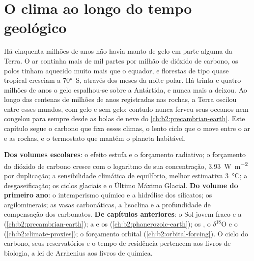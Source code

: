 \chapter{O clima ao longo do tempo geológico}\label{ch:b2:deep-time-climate}

Há cinquenta milhões de anos não havia manto de gelo em parte alguma da Terra. O ar continha mais de
mil partes por milhão de dióxido de carbono, os polos tinham aquecido muito mais que o equador, e
florestas de tipo quase tropical cresciam a \ang{70}~S, através dos meses da noite polar. Há trinta e quatro
milhões de anos o gelo espalhou-se sobre a Antártida, e nunca mais a deixou. Ao longo das centenas de milhões
de anos registradas nas rochas, a Terra oscilou entre esses mundos, com gelo e sem gelo; contudo
nunca ferveu seus oceanos nem congelou para sempre desde as bolas de neve do
\cref{ch:b2:precambrian-earth}. Este capítulo segue o carbono que fixa esses climas, o lento
ciclo que o move entre o ar e as rochas, e o termostato que mantém o planeta
habitável.

\begin{recall}
\textbf{Dos volumes escolares}: o efeito estufa e o forçamento radiativo; o forçamento do
dióxido de carbono cresce com o logaritmo de sua concentração, \qty{3.93}{W.m^{-2}} por duplicação;
a sensibilidade climática de equilíbrio, melhor estimativa \qty{3}{\celsius}; a desgaseificação; os ciclos glaciais
e o Último Máximo Glacial. \textbf{Do volume do primeiro ano}: o intemperismo químico e a
hidrólise dos silicatos; os argilominerais; as vasas carbonáticas, a lisoclina e a profundidade de
compensação dos carbonatos. \textbf{De capítulos anteriores}: o Sol jovem fraco e a 
(\cref{ch:b2:precambrian-earth}); a  e os 
(\cref{ch:b2:phanerozoic-earth}); os , o $\delta^{18}$O e o 
(\cref{ch:b2:climate-proxies}); o forçamento orbital (\cref{ch:b2:orbital-forcing}). O ciclo do carbono,
seus reservatórios e o tempo de residência pertencem aos livros de biologia, a lei de Arrhenius aos
livros de química.
\end{recall}

